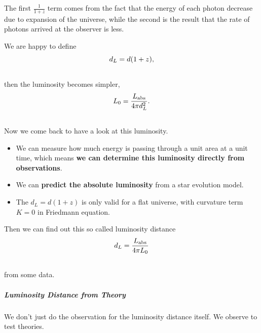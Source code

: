 \documentclass[letterpaper,10pt,english]{sphinxmanual}
\begin{document}
{The first $\frac{1}{1+z}$ term comes from the fact that the energy of each photon decrease due to expansion of the universe, while the second is the result that the rate of photons arrived at the observer is less.

We are happy to define
\begin{gather}
\begin{split}d_L = d (1+z) ,\end{split}\notag\\\begin{split}\end{split}\notag
\end{gather}
then the luminosity becomes simpler,
\begin{gather}
\begin{split}L_0 = \frac{L_{\mathrm {abs}}}{4\pi d_L^2} .\end{split}\notag\\\begin{split}\end{split}\notag
\end{gather}
Now we come back to have a look at this luminosity.
\begin{itemize}
\item {} 
We can measure how much energy is passing through a unit area at a unit time, which means \textbf{we can determine this luminosity directly from observations}.

\item {} 
We can \textbf{predict the absolute luminosity} from a star evolution model.

\item {} 
The $d_L = d (1+z)$ is only valid for a flat universe, with curvature term $K=0$ in Friedmann equation.

\end{itemize}

Then we can find out this so called luminosity distance
\begin{gather}
\begin{split}d_L = \frac{  L_{\mathrm {abs}} }{ 4\pi L_0 }\end{split}\notag\\\begin{split}\end{split}\notag
\end{gather}
from some data.


\subparagraph{Luminosity Distance from Theory}
\label{Cosmology/cosmoIndex:luminosity-distance-from-theory}
We don't just do the observation for the luminosity distance itself.
We observe to test theories.

}
\end{document}
